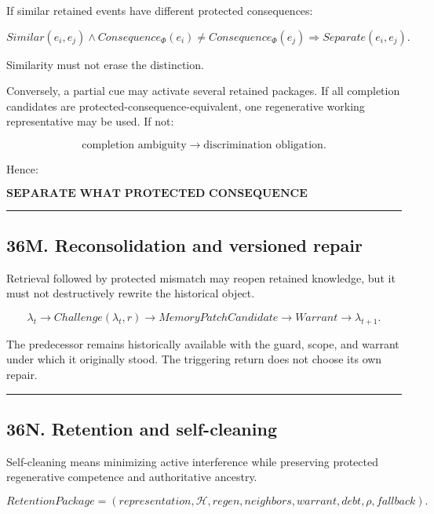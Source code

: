 \documentclass[
]{article}
\begin{document}
If similar retained events have different protected consequences:

\[
\boxed{
Similar(e_i,e_j)
\land
Consequence_{\Phi}(e_i)\neq Consequence_{\Phi}(e_j)
\Rightarrow
Separate(e_i,e_j).
}
\]

Similarity must not erase the distinction.

Conversely, a partial cue may activate several retained packages. If all
completion candidates are protected-consequence-equivalent, one regenerative
working representative may be used. If not:

\[
\boxed{
\text{completion ambiguity}
\to
\text{discrimination obligation}.
}
\]

Hence:

\[
\boxed{
\textbf{SEPARATE WHAT PROTECTED CONSEQUENCE DISTINGUISHES;
COMPLETE WHAT A CONSEQUENTIAL CUE REQUIRES.}
}
\]

\begin{center}\rule{0.5\linewidth}{0.5pt}\end{center}

\subsection{36M. Reconsolidation and versioned repair}\label{reconsolidation-and-versioned-repair}

Retrieval followed by protected mismatch may reopen retained knowledge, but it
must not destructively rewrite the historical object.

\[
\boxed{
\lambda_t
\to
Challenge(\lambda_t,r)
\to
MemoryPatchCandidate
\to
Warrant
\to
\lambda_{t+1}.
}
\]

The predecessor remains historically available with the guard, scope, and
warrant under which it originally stood. The triggering return does not choose
its own repair.

\begin{center}\rule{0.5\linewidth}{0.5pt}\end{center}

\subsection{36N. Retention and self-cleaning}\label{retention-and-self-cleaning}

Self-cleaning means minimizing active interference while preserving protected
regenerative competence and authoritative ancestry.

\[
\boxed{
RetentionPackage
=
(
representation,
\mathcal H,
regen,
neighbors,
warrant,
debt,
\rho,
fallback
).
}
\]
\end{document}
